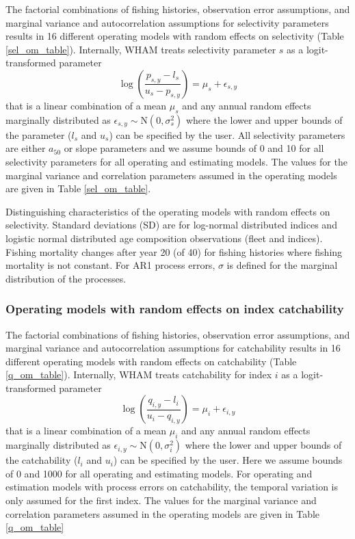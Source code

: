 \documentclass[
  12pt,
]{article}
\begin{document}
The factorial combinations of fishing histories, observation error
assumptions, and marginal variance and autocorrelation assumptions for
selectivity parameters results in 16 different operating models with
random effects on selectivity (Table \ref{sel_om_table}). Internally,
WHAM treats selectivity parameter \(s\) as a logit-transformed parameter
\[
\log\left(\frac{p_{s,y}-l_{s}}{u_{s}-p_{s,y}}\right) = \mu_s + \epsilon_{s,y}
\] that is a linear combination of a mean \(\mu_s\) and any annual
random effects marginally distributed as
\(\epsilon_{s,y} \sim \text{N}\left(0,\sigma_s^2\right)\) where the
lower and upper bounds of the parameter (\(l_s\) and \(u_s\)) can be
specified by the user. All selectivity parameters are either \(a_50\) or
slope parameters and we assume bounds of 0 and 10 for all selectivity
parameters for all operating and estimating models. The values for the
marginal variance and correlation parameters assumed in the operating
models are given in Table \ref{sel_om_table}.

\begin{landscape}
\begin{table}
\caption{Distinguishing characteristics of the operating models with random effects on selectivity. Standard deviations (SD) are for log-normal distributed indices and logistic normal distributed age composition observations (fleet and indices). Fishing mortality changes after year 20 (of 40) for fishing histories where fishing mortality is not constant. For AR1 process errors, $\sigma$ is defined for the marginal distribution of the processes.}\label{sel_om_table}
{}
\end{table}
\end{landscape}

\hypertarget{operating-models-with-random-effects-on-index-catchability}{%
\subsubsection*{Operating models with random effects on index
catchability}\label{operating-models-with-random-effects-on-index-catchability}}

The factorial combinations of fishing histories, observation error
assumptions, and marginal variance and autocorrelation assumptions for
catchability results in 16 different operating models with random
effects on catchability (Table \ref{q_om_table}). Internally, WHAM
treats catchability for index \(i\) as a logit-transformed parameter \[
\log\left(\frac{q_{i,y}-l_{i}}{u_{i}-q_{i,y}}\right) = \mu_i + \epsilon_{i,y}
\] that is a linear combination of a mean \(\mu_i\) and any annual
random effects marginally distributed as
\(\epsilon_{i,y} \sim \text{N}\left(0,\sigma_i^2\right)\) where the
lower and upper bounds of the catchability (\(l_i\) and \(u_i\)) can be
specified by the user. Here we assume bounds of 0 and 1000 for all
operating and estimating models. For operating and estimation models
with process errors on catchability, the temporal variation is only
assumed for the first index. The values for the marginal variance and
correlation parameters assumed in the operating models are given in
Table \ref{q_om_table}
\end{document}
